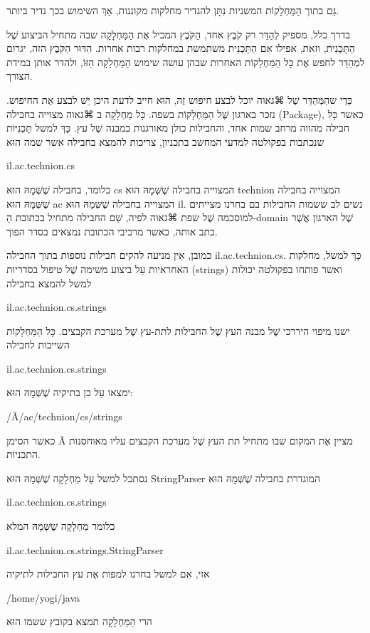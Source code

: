 גַּם בתוך הַמַּחְלָקוֹת המשניות נִתָּן להגדיר מחלקות מקוננות, אַךְ השימוש בכך
נדיר ביותר.

בדרך כלל, מספיק לְהַדֵּר רק קֹבֶץ אחד, הַקֹּבֶץ המכיל אֶת הַמַּחְלָקָה שבה מתחיל
הביצוע שֶׁל הַתָּכְנִית, וזאת, אפילו אִם הַתָּכְנִית משתמשת במחלקות רבות אחרות.
הִדּוּר הַקֹּבֶץ הזה, יגרום למְהַדֵּר לחפש אֶת כָּל הַמַּחְלָקוֹת האחרות שבהן
עושה שימוש הַמַּחְלָקָה הַזּוֹ, ולהדר אותן במידת הצורך.

כְּדֵי שהַמְּהַדֵּר שֶׁל ⌘גאוה יוכל לבצע חיפוש זֶה, הוּא חייב לדעת היכן יֵשׁ לבצע
אֶת החיפוש. נזכר בארגון שֶׁל הַמַּחְלָקוֹת בשפה. כָּל מַחְלָקָה ב ⌘גאוה מצוייה
בחבילה (Package), כאשר כָּל חבילה מהווה מרחב שמות אחד, והחבילות כולן מאורגנות
במבנה שֶׁל עץ. כָּךְ למשל תָּכְנִיּוֹת שנכתבות בפקולטה למדעי המחשב בתכניון,
צריכות להמצא בחבילה אשר שמה הוּא

il.ac.technion.cs

כלומר, בחבילה שֶׁשְּׁמָהּ הוּא cs המצוייה בחבילה שֶׁשְּׁמָהּ הוּא technion
המצוייה בחבילה שֶׁשְּׁמָהּ הוּא ac המצוייה בחבילה שֶׁשְּׁמָהּ הוּא il. נשים לב
ששמות החבילות בם בחרנו מצייתים למוסכמה שֶׁל שפת ⌘גאוה לפיה, שֵׁם החבילה מתחיל
בכתובת הַ-domain שֶׁל הארגון אֲשֶׁר כתב אותה, כאשר מרכיבי הכתובת נמצאים בסדר
הפוך.

כמובן, אֵין מניעה להקים חבילות נוספות בתוך החבילה il.ac.technion.cs. כָּךְ למשל,
מחלקות האחראיות עַל ביצוע משימה שֶׁל טיפול בסדריות (strings) ואשר פותחו בפקולטה
יכולות למשל להמצא בחבילה

il.ac.technion.cs.strings

ישנו מיפוי היררכי שֶׁל מבנה העץ שֶׁל החבילות לתת-עץ שֶׁל מערכת הקבצים. כָּל
הַמַּחְלָקוֹת השייכות לחבילה

 il.ac.technion.cs.strings

ימצאו עַל כן בתיקיה שֶׁשְּׁמָהּ הוּא:

/Ã/ac/technion/cs/strings

כאשר הסימן Ã מציין אֶת המקום שבו מתחיל תת העץ שֶׁל מערכת הקבצים עליו מאוחסנות
התכניות.

נסתכל למשל עַל מַחְלָקָה שֶׁשְּׁמָהּ הוּא StringParser המוגדרת בחבילה
שֶׁשְּׁמָהּ הוּא

 il.ac.technion.cs.strings

כלומר מַחְלָקָה שֶׁשְּׁמָהּ המלא

il.ac.technion.cs.strings.StringParser

אזי, אִם למשל בחרנו למפות אֶת עץ החבילות לתיקיה

 /home/yogi/java

הרי הַמַּחְלָקָה תמצא בקובץ ששמו הוּא

